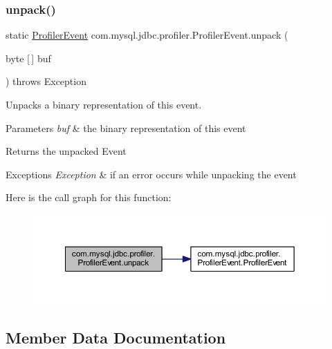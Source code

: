 \subsubsection{\texorpdfstring{unpack()}{unpack()}}
{\footnotesize\ttfamily static \mbox{\hyperlink{classcom_1_1mysql_1_1jdbc_1_1profiler_1_1_profiler_event}{Profiler\+Event}} com.\+mysql.\+jdbc.\+profiler.\+Profiler\+Event.\+unpack (\begin{DoxyParamCaption}\item[{byte \mbox{[}$\,$\mbox{]}}]{buf }\end{DoxyParamCaption}) throws Exception\hspace{0.3cm}{\ttfamily [static]}}

Unpacks a binary representation of this event.


\begin{DoxyParams}{Parameters}
{\em buf} & the binary representation of this event \\
\hline
\end{DoxyParams}
\begin{DoxyReturn}{Returns}
the unpacked Event 
\end{DoxyReturn}

\begin{DoxyExceptions}{Exceptions}
{\em Exception} & if an error occurs while unpacking the event \\
\hline
\end{DoxyExceptions}
Here is the call graph for this function\+:
\nopagebreak
\begin{figure}[H]
\begin{center}
\leavevmode
\includegraphics[width=350pt]{classcom_1_1mysql_1_1jdbc_1_1profiler_1_1_profiler_event_ae4fb6b9cacc1749a77df0c3eec048a8e_cgraph}
\end{center}
\end{figure}


\subsection{Member Data Documentation}
\mbox{\label{classcom_1_1mysql_1_1jdbc_1_1profiler_1_1_profiler_event_aa7004cee55f006e0666c602f1a5b07bc}} 
